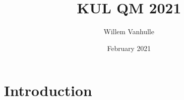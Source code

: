 \documentclass{article}
\title{KUL QM 2021}
\author{Willem Vanhulle}
\date{February 2021}
\begin{document}
\maketitle

\section{Introduction}
\end{document}
